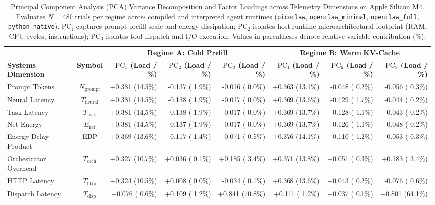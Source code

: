 \begin{table}[t]
\centering
\caption{Principal Component Analysis (PCA) Variance Decomposition and Factor Loadings across Telemetry Dimensions on Apple Silicon M4. Evaluates $N=480$ trials per regime across compiled and interpreted agent runtimes (\texttt{picoclaw}, \texttt{openclaw\_minimal}, \texttt{openclaw\_full}, \texttt{python\_native}). $\text{PC}_1$ captures prompt prefill scale and energy dissipation; $\text{PC}_2$ isolates host runtime microarchitectural footprint (RAM, CPU cycles, instructions); $\text{PC}_3$ isolates tool dispatch and I/O execution. Values in parentheses denote relative variable contribution (\%).}
\label{tab:pca_loadings}
\small
\begin{tabular}{l c r r r r r r}
\hline
 & & \multicolumn{3}{c}{\textbf{Regime A: Cold Prefill}} & \multicolumn{3}{c}{\textbf{Regime B: Warm KV-Cache}} \\
\cmidrule(lr){3-5} \cmidrule(lr){6-8}
\textbf{Systems Dimension} & \textbf{Symbol} & \textbf{$\text{PC}_1$ (Load / \%)} & \textbf{$\text{PC}_2$ (Load / \%)} & \textbf{$\text{PC}_3$ (Load / \%)} & \textbf{$\text{PC}_1$ (Load / \%)} & \textbf{$\text{PC}_2$ (Load / \%)} & \textbf{$\text{PC}_3$ (Load / \%)} \\
\hline
Prompt Tokens & $N_{\text{prompt}}$ & +0.381 (14.5\%) & -0.137 ( 1.9\%) & -0.016 ( 0.0\%) & +0.363 (13.1\%) & -0.048 ( 0.2\%) & -0.056 ( 0.3\%) \\
Neural Latency & $T_{\text{neural}}$ & +0.381 (14.5\%) & -0.138 ( 1.9\%) & -0.017 ( 0.0\%) & +0.369 (13.6\%) & -0.129 ( 1.7\%) & -0.044 ( 0.2\%) \\
Task Latency & $T_{\text{task}}$ & +0.381 (14.5\%) & -0.138 ( 1.9\%) & -0.017 ( 0.0\%) & +0.369 (13.7\%) & -0.128 ( 1.6\%) & -0.043 ( 0.2\%) \\
Net Energy & $E_{\text{net}}$ & +0.381 (14.5\%) & -0.137 ( 1.9\%) & -0.017 ( 0.0\%) & +0.369 (13.7\%) & -0.126 ( 1.6\%) & -0.048 ( 0.2\%) \\
Energy-Delay Product & EDP & +0.369 (13.6\%) & -0.117 ( 1.4\%) & -0.071 ( 0.5\%) & +0.376 (14.1\%) & -0.110 ( 1.2\%) & -0.053 ( 0.3\%) \\
Orchestrator Overhead & $T_{\text{orch}}$ & +0.327 (10.7\%) & +0.036 ( 0.1\%) & +0.185 ( 3.4\%) & +0.371 (13.8\%) & +0.051 ( 0.3\%) & +0.183 ( 3.4\%) \\
HTTP Latency & $T_{\text{http}}$ & +0.324 (10.5\%) & +0.008 ( 0.0\%) & -0.034 ( 0.1\%) & +0.368 (13.6\%) & +0.043 ( 0.2\%) & -0.076 ( 0.6\%) \\
Dispatch Latency & $T_{\text{disp}}$ & +0.076 ( 0.6\%) & +0.109 ( 1.2\%) & +0.841 (70.8\%) & +0.111 ( 1.2\%) & +0.037 ( 0.1\%) & +0.801 (64.1\%) \\

\end{tabular}
\end{table}
